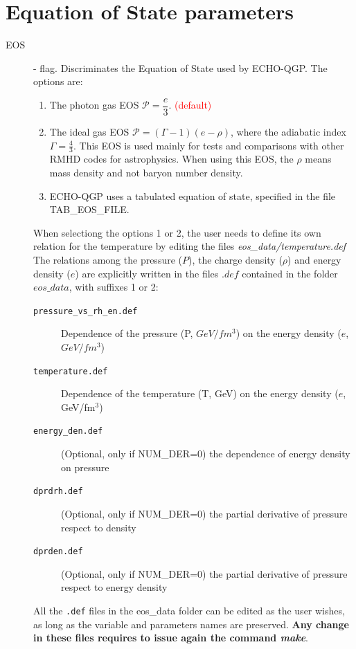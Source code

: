 \section{Equation of State parameters}
\begin{description}
\item[EOS] \integer - flag.  Discriminates the Equation of State used by ECHO-QGP. The options are:
\begin{enumerate} 
 \item The photon gas EOS $\mathcal{P}=\dfrac{e}{3}$.  \textcolor{red}{(default)}
 \item The ideal gas EOS $\mathcal{P}=(\Gamma-1)(e-\rho)$, where the adiabatic index $\Gamma=\frac{4}{3}$. This EOS is used mainly for tests and comparisons with other RMHD codes for astrophysics. When using this EOS, the $\rho$ means mass density and not baryon number density.
 \item ECHO-QGP uses a tabulated equation of state, specified in the file TAB\_EOS\_FILE. 
\end{enumerate}
 When selectiong the options 1 or 2, the user needs to define its own relation for the temperature by editing the files \emph{eos\_data/temperature.def}
 The relations among the pressure ($P$), the charge density ($\rho$) and energy density ($e$) are explicitly written in the files $.def$ contained in the folder $eos\_data$, with suffixes 1 or 2:
 \begin{description}
  \item[{\tt pressure\_vs\_rh\_en.def}]  Dependence of the pressure (P, $GeV/fm^3$) on the energy density ($e$, $GeV/fm^3$)
  \item[{\tt temperature.def}]  Dependence of the temperature (T, GeV) on the energy density ($e$, GeV/fm$^3$)
 \item[{\tt energy\_den.def}] (Optional, only if NUM\_DER=0) the dependence of energy density on pressure
 \item[{\tt dprdrh.def}](Optional, only if NUM\_DER=0) 
  the partial derivative of pressure respect to density 
 \item[{\tt dprden.def}](Optional, only if NUM\_DER=0) 
 the partial derivative of pressure respect to energy density
 \end{description}
  All the  {\tt *.def} files in the eos\_data folder can be edited as the user wishes, as long as the variable and parameters names are preserved. \textbf{Any change in these files  requires to issue again the command \textit{make}}.



\end{description}
